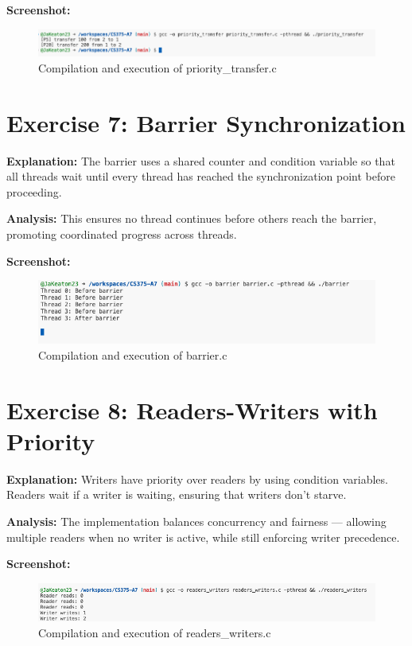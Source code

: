 \documentclass[a4paper,12pt]{article}
\begin{document}
\textbf{Screenshot:}  
\begin{figure}[h]
\centering
\includegraphics[width=\textwidth]{priority_transfer_output.png}
\caption{Compilation and execution of priority\_transfer.c}
\end{figure}

\section{Exercise 7: Barrier Synchronization}


\textbf{Explanation:}  
The barrier uses a shared counter and condition variable so that all threads wait until every thread has reached the synchronization point before proceeding.

\textbf{Analysis:}  
This ensures no thread continues before others reach the barrier, promoting coordinated progress across threads.

\textbf{Screenshot:}  
\begin{figure}[h]
\centering
\includegraphics[width=\textwidth]{barrier_output.png}
\caption{Compilation and execution of barrier.c}
\end{figure}

\section{Exercise 8: Readers-Writers with Priority}


\textbf{Explanation:}  
Writers have priority over readers by using condition variables. Readers wait if a writer is waiting, ensuring that writers don’t starve.

\textbf{Analysis:}  
The implementation balances concurrency and fairness — allowing multiple readers when no writer is active, while still enforcing writer precedence.

\textbf{Screenshot:}  
\begin{figure}[h]
\centering
\includegraphics[width=\textwidth]{readers_writers_output.png}
\caption{Compilation and execution of readers\_writers.c}
\end{figure}
\end{document}
